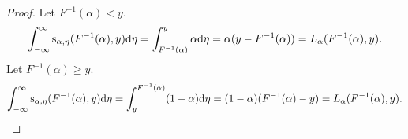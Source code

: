 \begin{proof}
    Let \(F^{-1}(\alpha) < y\). 
    \[ \int_{-\infty}^\infty \mathrm{s}_{\alpha, \eta}(F^{-1}(\alpha), y) \mathrm{d} \eta = \int_{F^{-1}(\alpha)}^y \alpha \mathrm{d} \eta = \alpha (y - F^{-1}(\alpha)) = L_\alpha(F^{-1}(\alpha), y). \]
    Let \(F^{-1}(\alpha) \geq y\). 
    \[ \int_{-\infty}^\infty \mathrm{s}_{\alpha, \eta}(F^{-1}(\alpha), y) \mathrm{d} \eta = \int_y^{F^{-1}(\alpha)} (1-\alpha) \mathrm{d} \eta = (1-\alpha) (F^{-1}(\alpha) - y) = L_\alpha(F^{-1}(\alpha), y). \]
\end{proof}